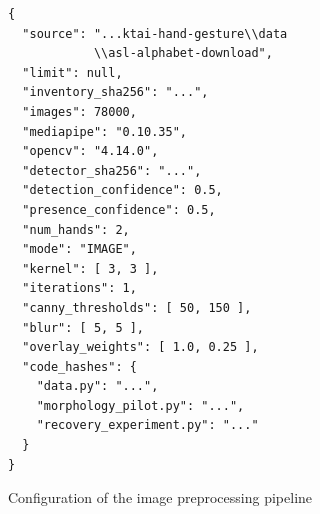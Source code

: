 \begin{figure}[H]
\centering
\begin{minipage}{0.95\linewidth}
\begin{verbatim}
{
  "source": "...ktai-hand-gesture\\data
            \\asl-alphabet-download",
  "limit": null,
  "inventory_sha256": "...",
  "images": 78000,
  "mediapipe": "0.10.35",
  "opencv": "4.14.0",
  "detector_sha256": "...",
  "detection_confidence": 0.5,
  "presence_confidence": 0.5,
  "num_hands": 2,
  "mode": "IMAGE",
  "kernel": [ 3, 3 ],
  "iterations": 1,
  "canny_thresholds": [ 50, 150 ],
  "blur": [ 5, 5 ],
  "overlay_weights": [ 1.0, 0.25 ],
  "code_hashes": {
    "data.py": "...",
    "morphology_pilot.py": "...",
    "recovery_experiment.py": "..."
  }
}
\end{verbatim}
\end{minipage}
\caption{Configuration of the image preprocessing pipeline}
\label{fig:preprocessing-config}
\end{figure}